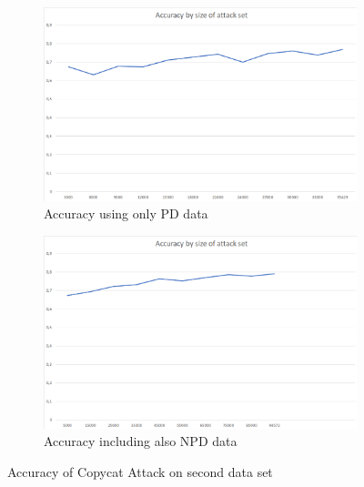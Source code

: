 \documentclass[a4paper,11pt]{article}
\begin{document}
        \begin{figure}[h!]
            \centering
            \begin{subfigure}[c]{0.49\textwidth}
                \centering                \includegraphics[width=1\textwidth]{exercise_3/paper/images/Accuracy_copy_cat_domain.png}
                \caption{Accuracy using only PD data}
                \label{fig:accuracy_cat_PD}
            \end{subfigure}
            \begin{subfigure}[c]{0.49\textwidth}
                \centering                \includegraphics[width=1\textwidth]{exercise_3/paper/images/Accuracy_copy_cat.png}
                \caption{Accuracy including also NPD data}
                \label{fig:accuracy_cat_PD+NPD}
            \end{subfigure}
            \caption{Accuracy of Copycat Attack on second data set}
            \label{fig:accuracy_cat}
        \end{figure}
\end{document}
